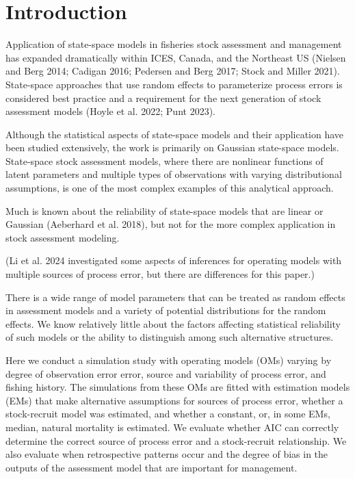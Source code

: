 \documentclass[
  12pt,
]{article}
\begin{document}
\pagebreak

\pagebreak

\hypertarget{introduction}{%
\section*{Introduction}\label{introduction}}

Application of state-space models in fisheries stock assessment and
management has expanded dramatically within ICES, Canada, and the
Northeast US (Nielsen and Berg 2014; Cadigan 2016; Pedersen and Berg
2017; Stock and Miller 2021). State-space approaches that use random
effects to parameterize process errors is considered best practice and a
requirement for the next generation of stock assessment models (Hoyle et
al. 2022; Punt 2023).

Although the statistical aspects of state-space models and their
application have been studied extensively, the work is primarily on
Gaussian state-space models. State-space stock assessment models, where
there are nonlinear functions of latent parameters and multiple types of
observations with varying distributional assumptions, is one of the most
complex examples of this analytical approach.

Much is known about the reliability of state-space models that are
linear or Gaussian (Aeberhard et al. 2018), but not for the more complex
application in stock assessment modeling.

(Li et al. 2024 investigated some aspects of inferences for operating
models with multiple sources of process error, but there are differences
for this paper.)

There is a wide range of model parameters that can be treated as random
effects in assessment models and a variety of potential distributions
for the random effects. We know relatively little about the factors
affecting statistical reliability of such models or the ability to
distinguish among such alternative structures.

Here we conduct a simulation study with operating models (OMs) varying
by degree of observation error error, source and variability of process
error, and fishing history. The simulations from these OMs are fitted
with estimation models (EMs) that make alternative assumptions for
sources of process error, whether a stock-recruit model was estimated,
and whether a constant, or, in some EMs, median, natural mortality is
estimated. We evaluate whether AIC can correctly determine the correct
source of process error and a stock-recruit relationship. We also
evaluate when retrospective patterns occur and the degree of bias in the
outputs of the assessment model that are important for management.
\end{document}
